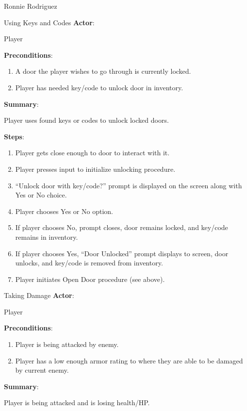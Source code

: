 \documentclass[12pt]{report}
\begin{document}
\begin{section}{Ronnie Rodriguez}
\begin{subsection}{Using Keys and Codes}
\textbf{Actor}:

Player

\textbf{Preconditions}:

\begin{enumerate}
\item A door the player wishes to go through is currently locked.
\item Player has needed key/code to unlock door in inventory.
\end{enumerate}

\textbf{Summary}:

Player uses found keys or codes to unlock locked doors.

\textbf{Steps}:

\begin{enumerate}
\item Player gets close enough to door to interact with it.
\item Player presses input to initialize unlocking procedure.
\item ``Unlock door with key/code?'' prompt is displayed on the screen along
with Yes or No choice.
\item Player chooses Yes or No option.
\item If player chooses No, prompt closes, door remains locked, and key/code
remains in inventory.
\item If player chooses Yes, ``Door Unlocked'' prompt displays to screen,
door unlocks, and key/code is removed from inventory.
\item Player initiates Open Door procedure (see above).
\end{enumerate}
\end{subsection}

\begin{subsection}{Taking Damage}
\textbf{Actor}:

Player

\textbf{Preconditions}:

\begin{enumerate}
\item Player is being attacked by enemy.
\item Player has a low enough armor rating to where they are able to be
damaged by current enemy.
\end{enumerate}

\textbf{Summary}:

Player is being attacked and is losing health/HP.


\end{subsection}
\end{section}
\end{document}
